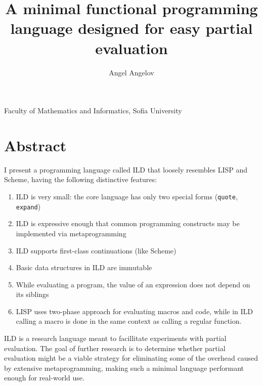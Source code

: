 \documentclass[11pt]{amsart}
\title[Title]{\bf A minimal functional programming language designed for easy partial evaluation}
\author[Angel]{Angel Angelov}
\newcommand\lang{ILD }
\theoremstyle{definition}
\begin{document}
\maketitle

\begin{center}
Faculty of Mathematics and Informatics, Sofia University
\end{center}

\section*{Abstract}

I present a programming language called \lang that loosely resembles LISP
and Scheme, having the following distinctive features:

\begin{enumerate}
    \item \lang is very small: the core language has only two special
    forms (\texttt{quote}, \texttt{expand})
    \item \lang is expressive enough that common programming constructs may
    be implemented via metaprogramming
    \item \lang supports first-class continuations (like Scheme)
    \item\label{immutable} Basic data structures in \lang are immutable
    \item\label{isolatedsiblings} While evaluating a program, the value of an expression does not
    depend on its siblings
    \item\label{runtimemacros} LISP uses two-phase approach for evaluating macros and code,
    while in \lang calling a macro is done in the same context as
    calling a regular function.
\end{enumerate}

\lang is a research language meant to facillitate experiments with partial evaluation.
The goal of further research is to determine whether partial evaluation might be
a viable strategy for eliminating some of the overhead caused by extensive metaprogramming,
making such a minimal language performant enough for real-world use.



%
%
%
%

\bigskip
\end{document}
